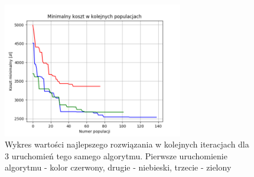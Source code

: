 \documentclass[12pt, oneside, final]{report}
\begin{document}
\begin{figure}[ht!]
\centering
\includegraphics[width=0.7\textwidth]{graphics/diff-population}
\caption{Wykres wartości najlepszego rozwiązania w kolejnych iteracjach dla 3 uruchomień tego samego algorytmu. Pierwsze uruchomienie algorytmu - kolor czerwony, drugie - niebieski, trzecie - zielony}
\label{fig:diff-population}
\end{figure}

 
\end{document}

